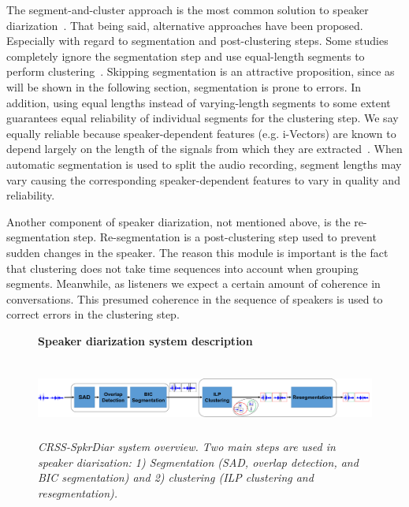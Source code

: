 The segment-and-cluster approach is the most common solution to speaker diarization~\cite{meignier2010lium,anguera2012diarization}. 
That being said, alternative approaches have been proposed. 
Especially with regard to segmentation and post-clustering steps. 
Some studies completely ignore the segmentation step and use equal-length segments to perform clustering~\cite{sell_garcia_2015diarization}. 
Skipping segmentation is an attractive proposition, since as will be shown in the following section, segmentation is prone to errors. 
In addition, using equal lengths instead of varying-length segments to some extent guarantees equal reliability of individual segments for the clustering step. 
We say equally reliable because speaker-dependent features (e.g. i-Vectors) are known to depend largely on the length of the signals from which they are extracted~\cite{hasan2013duration}. 
When automatic segmentation is used to split the audio recording, segment lengths may vary causing the corresponding speaker-dependent features to vary in quality and reliability. 

Another component of speaker diarization, not mentioned above, is the re-segmentation step. 
Re-segmentation is a post-clustering step used to prevent sudden changes in the speaker. 
The reason this module is important is the fact that clustering does not take time sequences into account when grouping segments. 
Meanwhile, as listeners we expect a certain amount of coherence in conversations. 
This presumed coherence in the sequence of speakers is used to correct errors in the clustering step. 

\begin{figure}[t!]
	\centering
	\textbf{Speaker diarization system description}\par\medskip
	\includegraphics[height = 1in, width=1\textwidth]{figures/crssdiar_outline}
	\caption{\it \small CRSS-SpkrDiar system overview. Two main steps are used in speaker diarization: 1) Segmentation (SAD, overlap detection, and BIC segmentation) and 2) clustering (ILP clustering and resegmentation). }
	\label{fig:crssdiar}
	\vspace{-3mm}
\end{figure}


